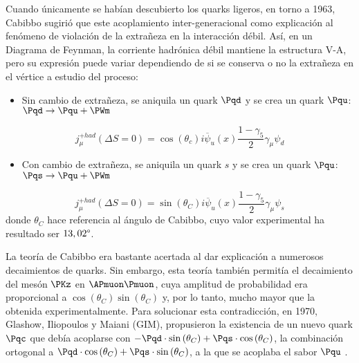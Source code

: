 Cuando únicamente se habían descubierto los quarks ligeros, en torno a 1963, Cabibbo sugirió que este acoplamiento inter-generacional como explicación al fenómeno de violación de la extrañeza en la interacción débil. Así, en un Diagrama de Feynman, la corriente hadrónica débil mantiene la estructura V-A, pero su expresión puede variar dependiendo de si se conserva o no la extrañeza en el vértice a estudio del proceso:
\begin{itemize}
\item Sin cambio de extrañeza, se aniquila un quark $\Pqd$ y se crea un quark $\Pqu$: $\Pqd \rightarrow \Pqu + \PWm$
\end{itemize}
\begin{equation}
j_{\mu}^{+had}(\Delta S= 0)=\cos \left( \theta _{c}\right) i\overline{\psi }_{u}\left( x\right) \dfrac{1-\gamma _{5}}{2}\gamma _{\mu }\psi _{d}
\end{equation}
\begin{itemize}
\item Con cambio de extrañeza, se aniquila un quark $s$ y se crea un quark $\Pqu$: $\Pqs \rightarrow \Pqu + \PWm$
\end{itemize}
\begin{equation}
j_{\mu}^{+had}(\Delta S= 0)=\sin \left( \theta _{C}\right) i\overline{\psi }_{u}\left( x\right) \dfrac{1-\gamma _{5}}{2}\gamma _{\mu }\psi _{s}
\end{equation}
donde $\theta_{C}$ hace referencia al ángulo de Cabibbo, cuyo valor experimental ha resultado ser $13,02\degree$.

La teoría de Cabibbo era bastante acertada al dar explicación a numerosos decaimientos de quarks. Sin embargo, esta teoría también permitía el decaimiento del mesón $\PKz$ en $\APmuon\Pmuon$, cuya amplitud de probabilidad era proporcional a $\cos \left( \theta _{C}\right) \sin \left( \theta _{C}\right)$ y, por lo tanto, mucho mayor que la obtenida experimentalmente.  Para solucionar esta contradicción, en 1970, Glashow, Iliopoulos y Maiani (GIM), propusieron la existencia de un nuevo quark $\Pqc$ que debía acoplarse con $-\Pqd \cdot \sin \left( \theta _{C}\right) + \Pqs \cdot \cos \left( \theta_C \right)$, la combinación ortogonal a $\Pqd \cdot \cos \left( \theta _{C}\right) + \Pqs \cdot \sin \left( \theta _{C}\right)$, a la que se acoplaba el sabor $\Pqu$ \cite{Griffiths2008}.

